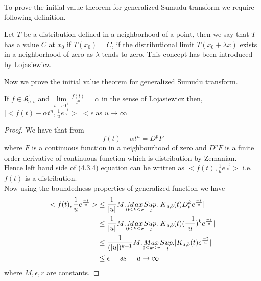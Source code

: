 To prove the initial value theorem for generalized Sumudu transform we require following definition.
\begin{definition}
Let $T$ be a distribution defined in a neighborhood of a point, then we say that $T$ has a value $C$ at $x_{0}$ if $T(x_{0})=C$, if the distributional limit $T(x_{0}+\lambda x)$ exists in a neighborhood of zero as $\lambda$ tends to zero. This concept has been introduced by Lojasiewicz.
\end{definition}
Now we prove the initial value theorem for generalized Sumudu transform.
\begin{theorem}
If $f\in \mathfrak{K}_{a,b}^{'}$ and 
$\underset{t\rightarrow 0^{+}}\lim \frac{f(t)}{t^{n}}=\alpha$ in the sense of Lojasiewicz then,
$\vert<f(t)-\alpha t^{n},\frac{1}{u}e^{\frac{-t}{u}}>\vert<\epsilon$ as $u\rightarrow \infty$\\
\end{theorem}
\begin{proof}
We have that from \cite{R53}
\begin{equation}
 f(t)-\alpha t^{n} = D^{p}F
\end{equation} 
where $F$ is a continuous function in a neighbourhood of zero and $ D^{p}F $ is a finite order derivative of continuous function which is distribution by Zemanian\cite{R75}.\\
Hence left hand side of (4.3.4) equation can be written as $ <f(t),\frac{1}{u}e^{\frac{-t}{u}}> $ i.e. $f(t)$ is a distribution.\\
Now using the boundedness properties of generalized function we have
\begin{align*}
<f(t),\frac{1}{u}e^{\frac{-t}{u}}> & \leq \frac{1}{\vert u \vert}M.\underset{0\leq k\leq r}{Max}\underset{t}{Sup.}\vert K_{a,b}(t)D^{k}_{t}e^{\frac{-t}{u}} \vert\\
& \leq \frac{1}{\vert u \vert}M.\underset{0\leq k\leq r}{Max}\underset{t}{Sup.}\vert K_{a,b}(t)(\frac{-1}{u})^{k}e^{\frac{-t}{u}} \vert\\
&\leq \frac{1}{(\vert u \vert)^{k+1}}M.\underset{0\leq k\leq r}{Max}\underset{t}{Sup.}\vert K_{a,b}(t)e^{\frac{-t}{u}} \vert  \\ 
&\leq \epsilon \hspace{0.5cm} \text{as}\hspace{0.5cm} u \rightarrow \infty    
\end{align*}
where $ M,\epsilon,r $ are constants.
\end{proof}
